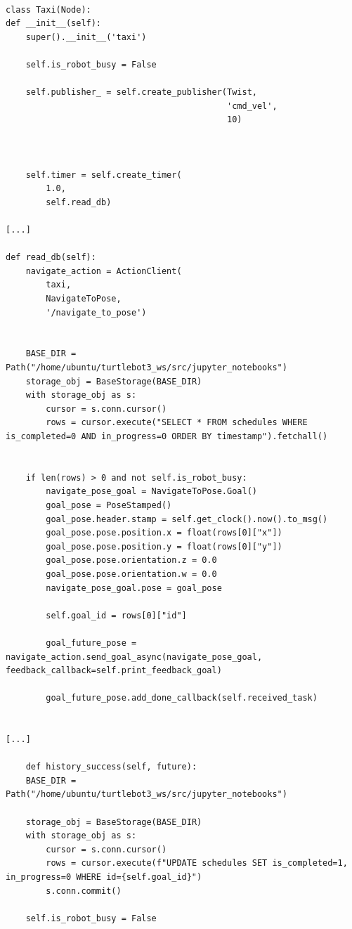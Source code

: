 \documentclass[12pt]{article}
\newcommand{\vsp}{\vspace{0.5cm}}
\begin{document}
\vsp

\begin{lstlisting}

class Taxi(Node):
def __init__(self): 
    super().__init__('taxi')

    self.is_robot_busy = False
    
    self.publisher_ = self.create_publisher(Twist, 
                                            'cmd_vel',
                                            10)
    


    self.timer = self.create_timer(
        1.0,
        self.read_db)

[...]

def read_db(self):
    navigate_action = ActionClient(
        taxi, 
        NavigateToPose,
        '/navigate_to_pose')


    BASE_DIR = Path("/home/ubuntu/turtlebot3_ws/src/jupyter_notebooks")
    storage_obj = BaseStorage(BASE_DIR)
    with storage_obj as s:
        cursor = s.conn.cursor()
        rows = cursor.execute("SELECT * FROM schedules WHERE is_completed=0 AND in_progress=0 ORDER BY timestamp").fetchall()


    if len(rows) > 0 and not self.is_robot_busy:
        navigate_pose_goal = NavigateToPose.Goal()    
        goal_pose = PoseStamped()
        goal_pose.header.stamp = self.get_clock().now().to_msg()
        goal_pose.pose.position.x = float(rows[0]["x"])
        goal_pose.pose.position.y = float(rows[0]["y"])
        goal_pose.pose.orientation.z = 0.0
        goal_pose.pose.orientation.w = 0.0
        navigate_pose_goal.pose = goal_pose

        self.goal_id = rows[0]["id"]

        goal_future_pose = navigate_action.send_goal_async(navigate_pose_goal, feedback_callback=self.print_feedback_goal)

        goal_future_pose.add_done_callback(self.received_task)


[...]

    def history_success(self, future):
    BASE_DIR = Path("/home/ubuntu/turtlebot3_ws/src/jupyter_notebooks")

    storage_obj = BaseStorage(BASE_DIR)
    with storage_obj as s:
        cursor = s.conn.cursor()
        rows = cursor.execute(f"UPDATE schedules SET is_completed=1, in_progress=0 WHERE id={self.goal_id}")
        s.conn.commit()

    self.is_robot_busy = False
    
\end{lstlisting}
\end{document}
